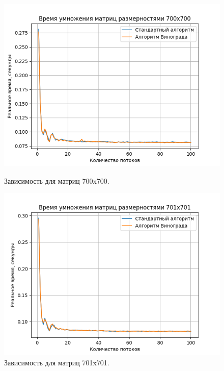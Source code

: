 \documentclass[a4paper,12pt]{article}
\begin{document}
\begin{figure}[H]
\begin{center}
\begin{minipage}[H]{0.48\linewidth}
\includegraphics[width=1\linewidth]{700x700.png}
\caption{Зависимость для матриц 700x700.}
\label{ris:experimoriginal}
\end{minipage}
\hfill
\begin{minipage}[H]{0.48\linewidth}
\includegraphics[width=1\linewidth]{701x701.png}
\caption{Зависимость для матриц 701x701.}
\label{ris:experimcoded}
\end{minipage}
\end{center}
\begin{center}
\begin{minipage}[H]{0.48\linewidth}

\end{minipage}
\end{center}
\end{figure}
\end{document}
